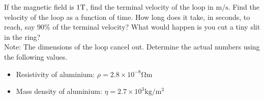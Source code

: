 \documentclass[fleqn, a4paper, 8pt, twoside]{amsart}
\theoremstyle{definition}
\theoremstyle{theorem}
\begin{document}
\begin{multicols}{2}
\begin{spacing}{0.6}
\begin{question}
\begin{figure}[H]
	\end{figure}
	If the magnetic field is $1 \tesla$, find the terminal velocity of the loop in $\si{\metre\per\second}$.
	Find the velocity of the loop as a function of time.
	How long does it take, in seconds, to reach, say $90\%$ of the terminal velocity?
	What would happen is you cut a tiny slit in the ring?\\
	Note: The dimensions of the loop cancel out.
	Determine the actual numbers using the following values.
	\begin{itemize}
		\item Resistivity of aluminium: $\rho = 2.8 \times 10^{-8} \si{\ohm\metre}$
		\item Mass density of aluminium: $\eta = 2.7 \times 10^3 \si{\kg\per\metre\cubed}$
	\end{itemize}
\end{question}


\end{spacing}
\end{multicols}
\end{document}
